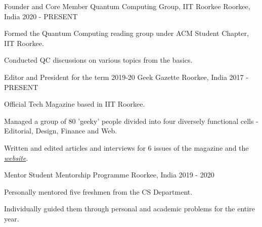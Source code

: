 

\begin{cventries}
  \cventry
    {Founder and Core Member} %
    {Quantum Computing Group, IIT Roorkee} %
    {Roorkee, India} %
    {2020 - PRESENT} %
    {
      \begin{cvitems} %
        \item {Formed the Quantum Computing reading group under ACM Student Chapter, IIT Roorkee.}
        \item {Conducted QC discussions on various topics from the basics.}
      \end{cvitems}
    }

  \cventry
    {Editor and President for the term 2019-20} %
    {Geek Gazette} %
    {Roorkee, India} %
    {2017 - PRESENT} %
    {
      \begin{cvitems} %
        \item {Official Tech Magazine based in IIT Roorkee.}
        \item {Managed a group of 80 'geeky' people divided into four diversely functional cells - Editorial, Design, Finance and Web.}
        \item {Written and edited articles and interviews for 6 issues of the magazine and the \emph{\href{https://geekgazette.iitr.ac.in}{website}}.}
      \end{cvitems}
    }

  \cventry
    {Mentor} %
    {Student Mentorship Programme} %
    {Roorkee, India} %
    {2019 - 2020} %
    {
      \begin{cvitems} %
        \item {Personally mentored five freshmen from the CS Department.}
        \item {Individually guided them through personal and academic problems for the entire year.}
      \end{cvitems}
    }


\end{cventries}
